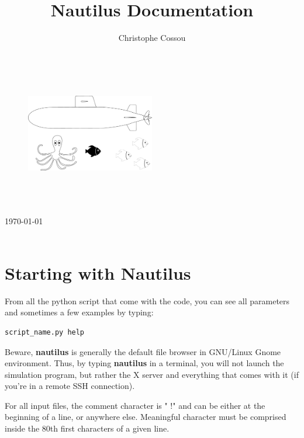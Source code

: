 \documentclass[english,a4paper,twoside]{article}
\title{Nautilus Documentation}
\author{Christophe Cossou}
\begin{document}
\begin{titlepage}
\begin{center}
~
\vfill
\begin{figure}[t]
\centering
\includegraphics[width=0.5\textwidth]{figures/nautilus_logo.pdf}%
\end{figure}

\HRule \\[0.4cm]
{ \huge \bfseries \makeatletter\@title\makeatother}\\[0.4cm]

\HRule \\[0.75cm]
{\large \today}\\[0.75cm]
\makeatletter
\@author
\makeatother
\vfill
\vfill
~


\end{center}
\end{titlepage}

\cleardoublepage

\tableofcontents

\cleardoublepage

\section{Starting with Nautilus}
From all the python script that come with the code, you can see all parameters and sometimes a few examples by typing:
\begin{verbatim}
script_name.py help
\end{verbatim}

\begin{attention}
Beware, \textbf{nautilus} is generally the default file browser in GNU/Linux Gnome environment. Thus, by typing \textbf{nautilus} in a terminal, you will not launch the simulation program, but rather the X server and everything that comes with it (if you're in a remote SSH connection).
\end{attention}

For all input files, the comment character is " !" and can be either at the beginning of a line, or anywhere else. Meaningful character must be comprised inside the 80th first characters of a given line.
\end{document}
